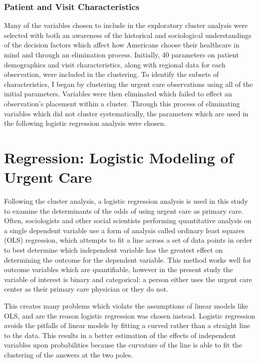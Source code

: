 \documentclass[12pt,twoside]{reedthesis}
\begin{document}
  \subsubsection*{Patient and Visit
  Characteristics}\label{patient-and-visit-characteristics}
  
  Many of the variables chosen to include in the exploratory cluster
  analysis were selected with both an awareness of the historical and
  sociological understandings of the decision factors which affect how
  Americans choose their healthcare in mind and through an elimination
  process. Initially, 40 parameters on patient demographics and visit
  characteristics, along with regional data for each observation, were
  included in the clustering. To identify the subsets of characteristics,
  I began by clustering the urgent care observations using all of the
  initial parameters. Variables were then eliminated which failed to
  effect an observation's placement within a cluster. Through this process
  of eliminating variables which did not cluster systematically, the
  parameters which are used in the following logistic regression analysis
  were chosen.
  
  \section*{Regression: Logistic Modeling of Urgent
  Care}\label{regression-logistic-modeling-of-urgent-care}
  
  Following the cluster analysis, a logistic regression analysis is used
  in this study to examine the determinants of the odds of using urgent
  care as primary care. Often, sociologists and other social scientists
  performing quantitative analysis on a single dependent variable use a
  form of analysis called ordinary least squares (OLS) regression, which
  attempts to fit a line across a set of data points in order to best
  determine which independent variable has the greatest effect on
  determining the outcome for the dependent variable. This method works
  well for outcome variables which are quantifiable, however in the
  present study the variable of interest is binary and categorical: a
  person either uses the urgent care center as their primary care
  physician or they do not.
  
  This creates many problems which violate the assumptions of linear
  models like OLS, and are the reason logistic regression was chosen
  instead. Logistic regression avoids the pitfalls of linear models by
  fitting a curved rather than a straight line to the data. This results
  in a better estimation of the effects of independent variables upon
  probabilities because the curvature of the line is able to fit the
  clustering of the answers at the two poles.
  
\end{document}
